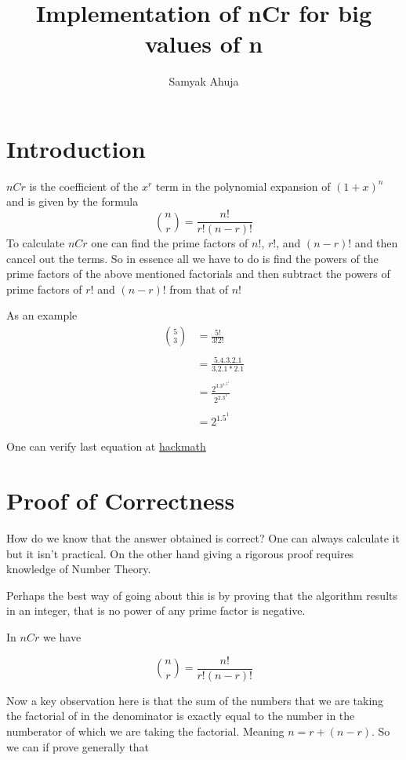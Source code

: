 \documentclass{article}
\title{Implementation of nCr for big values of n}
\author{Samyak Ahuja}
\begin{document}
\maketitle

\section{Introduction}
$nCr$ is the coefficient of the $x^r$ term in the polynomial
expansion of $(1+x)^n$ and is given by the formula
\[
    \binom{n}{r} = \frac{n!}{r!(n-r)!}
\]
To calculate $nCr$ one can find the prime factors of $n!$, $r!$, 
and $(n-r)!$ and then cancel out the terms. So in essence all we
have to do is find the powers of the prime factors of the above 
mentioned factorials and then subtract the powers of prime factors 
of $r!$ and $(n-r)!$ from that of $n!$

\vspace{0.2in}

As an example
\begin{align*}
\binom{5}{3} &= \frac{5!}{3!2!} \\\\
&= \frac{5.4.3.2.1}{3.2.1 * 2.1}\\\\
&= \frac{2^3.3^1.5^1}{2^2.3^1}\\\\
&= 2^1.5^1
\end{align*}

One can verify last equation at
\href{https://www.hackmath.net/en/calculator/n-choose-k}{hackmath}

\section{Proof of Correctness}

How do we know that the answer obtained is correct? One can always
calculate it but it isn't practical. On the other hand giving a
rigorous proof requires knowledge of Number Theory. 

Perhaps the best way of going about this is by proving that
the algorithm results in an integer, that is no power of any 
prime factor is negative.

In $nCr$ we have

\[
    \binom{n}{r} = \frac{n!}{r!(n-r)!}
\]

Now a key observation here is that the sum of the numbers that we are
taking the factorial of in the denominator is exactly equal to the 
number in the numberator of which we are taking the factorial. Meaning
$n = r + (n - r)$. So we can if prove generally that
\end{document}
